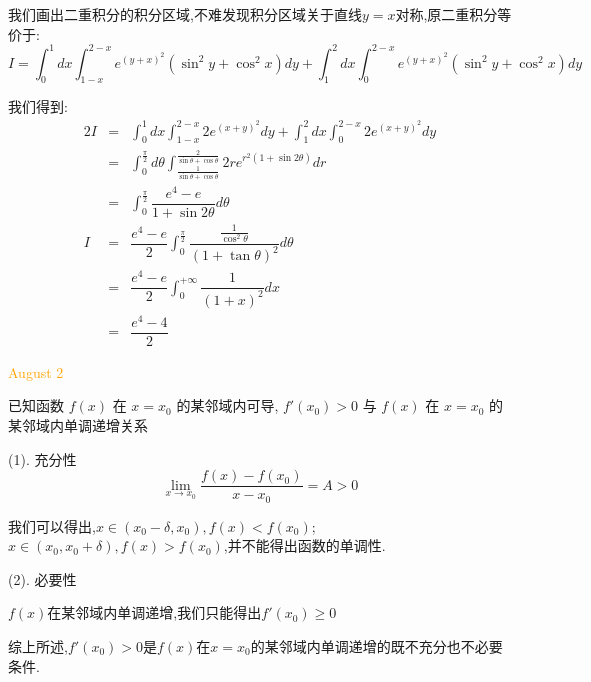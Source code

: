 \begin{solution}
	
	我们画出二重积分的积分区域,不难发现积分区域关于直线$y=x$对称,原二重积分等价于: 
	$$I=\int_{0}^{1}dx\int_{1-x}^{2-x}e^{(y+x)^2}(\sin^2y+\cos^2x)dy+\int_{1}^{2}dx\int_{0}^{2-x}e^{(y+x)^2}(\sin^2y+\cos^2x)dy$$
	
	我们得到: 
	\begin{eqnarray*}
		2I&=&\int_{0}^{1}dx\int_{1-x}^{2-x}2e^{(x+y)^2}dy+\int_{1}^{2}dx\int_{0}^{2-x}2e^{(x+y)^2}dy\\
		&=&\int_{0}^{\frac{\pi}{2}}d\theta\int_{\frac{1}{\sin\theta+\cos\theta}}^{\frac{2}{\sin\theta+\cos\theta}}2re^{r^2(1+\sin 2\theta)}dr\\
		&=&\int_{0}^{\frac{\pi}{2}}\dfrac{e^4-e}{1+\sin2\theta}d\theta\\
		I&=&\dfrac{e^4-e}{2}\int_{0}^{\frac{\pi}{2}}\dfrac{\frac{1}{\cos^2\theta}}{(1+\tan\theta)^2}d\theta\\
		&=&\dfrac{e^4-e}{2}\int_{0}^{+\infty}\dfrac{1}{(1+x)^2}dx\\
		&=&\dfrac{e^4-4}{2}
	\end{eqnarray*}
\end{solution}


\textcolor{orange}{August 2}

\begin{example}[][Exam: 34.1.3]
	已知函数 $f(x)$ 在 $x=x_{0}$ 的某邻域内可导, $f'(x_{0})>0$ 与 $f(x)$ 在 $x=x_{0}$ 的某邻域内单调递增关系
\end{example}

\begin{solution}
	
	(1). 充分性
	$$\lim\limits_{x\to x_{0}}\dfrac{f(x)-f(x_{0})}{x-x_{0}}=A>0$$
	
	我们可以得出,$x\in(x_{0}-\delta,x_{0}),f(x)<f(x_{0})$;$x\in(x_{0},x_{0}+\delta),f(x)>f(x_{0})$,并不能得出函数的单调性.
	
	(2). 必要性
	
	$f(x)$在某邻域内单调递增,我们只能得出$f'(x_{0})\geq 0$
	
	综上所述,$f'(x_{0})>0$是$f(x)$在$x=x_{0}$的某邻域内单调递增的既不充分也不必要条件.
\end{solution}

